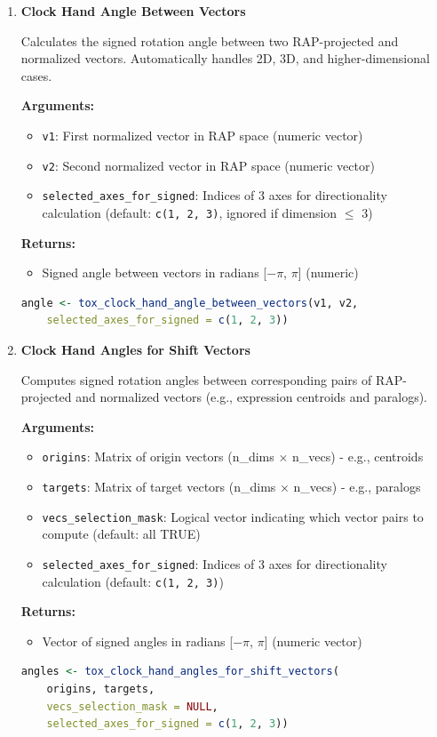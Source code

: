 \begin{enumerate}
    \item \textbf{Clock Hand Angle Between Vectors}

    Calculates the signed rotation angle between two RAP-projected and normalized vectors. Automatically handles 2D, 3D, and higher-dimensional cases.
    
    \textbf{Arguments:}
    \begin{itemize}
        \item \texttt{v1}: First normalized vector in RAP space (numeric vector)
        \item \texttt{v2}: Second normalized vector in RAP space (numeric vector)
        \item \texttt{selected\_axes\_for\_signed}: Indices of 3 axes for directionality calculation (default: \texttt{c(1, 2, 3)}, ignored if dimension $\leq$ 3)
    \end{itemize}
    \textbf{Returns:}
    \begin{itemize}
        \item Signed angle between vectors in radians [$-\pi$, $\pi$] (numeric)
    \end{itemize}
\begin{lstlisting}[language=R, caption={Signed Angle Between Vectors}]
angle <- tox_clock_hand_angle_between_vectors(v1, v2, 
    selected_axes_for_signed = c(1, 2, 3))
\end{lstlisting}

    \item \textbf{Clock Hand Angles for Shift Vectors}

    Computes signed rotation angles between corresponding pairs of RAP-projected and normalized vectors (e.g., expression centroids and paralogs).
    
    \textbf{Arguments:}
    \begin{itemize}
        \item \texttt{origins}: Matrix of origin vectors (n\_dims × n\_vecs) - e.g., centroids
        \item \texttt{targets}: Matrix of target vectors (n\_dims × n\_vecs) - e.g., paralogs
        \item \texttt{vecs\_selection\_mask}: Logical vector indicating which vector pairs to compute (default: all TRUE)
        \item \texttt{selected\_axes\_for\_signed}: Indices of 3 axes for directionality calculation (default: \texttt{c(1, 2, 3)})
    \end{itemize}
    \textbf{Returns:}
    \begin{itemize}
        \item Vector of signed angles in radians [$-\pi$, $\pi$] (numeric vector)
    \end{itemize}
\begin{lstlisting}[language=R, caption={Batch Angle Calculation for Vector Pairs}]
angles <- tox_clock_hand_angles_for_shift_vectors(
    origins, targets, 
    vecs_selection_mask = NULL,
    selected_axes_for_signed = c(1, 2, 3))
\end{lstlisting}


\end{enumerate}
